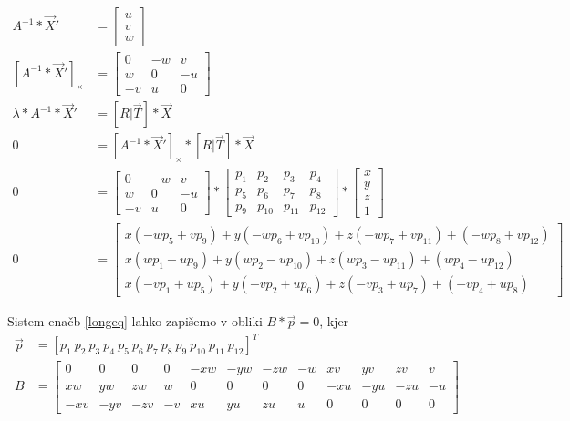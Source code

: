 \documentclass[a4paper, 12pt]{book}
\begin{document}
\begin{align}
\label{uvw}
A^{-1} * \vec{X}' &=
\begin{bmatrix}
u \\
v \\
w
\end{bmatrix} \\
[A^{-1} * \vec{X}']_{\times} &=
\begin{bmatrix}
0 & -w & v \\
w & 0 & -u \\
-v & u & 0
\end{bmatrix} \\[5ex]
\lambda * A^{-1} * \vec{X}' &= [R | \vec{T}] * \vec{X} \\
0 &= [A^{-1} * \vec{X}']_{\times} * [R | \vec{T}] * \vec{X}\\
0 &= 
\begin{bmatrix}
0 & -w & v \\
w & 0 & -u \\
-v & u & 0
\end{bmatrix}
*
\begin{bmatrix}
p_1 & p_2 & p_3 & p_4 \\
p_5 & p_6 & p_7 & p_8 \\
p_9 & p_{10} & p_{11} & p_{12}
\end{bmatrix}
*
\begin{bmatrix}
x \\
y \\
z \\
1
\end{bmatrix} \\
0 &= 
\begin{bmatrix}
x(-wp_5 + vp_9) + y(-wp_6 + vp_{10}) + z(-wp_7 + vp_{11}) + (-wp_8 + vp_{12}) \\
x(wp_1 - up_9) + y(wp_2 - up_{10}) + z(wp_3 - up_{11}) + (wp_4 - up_{12}) \\
x(-vp_1 + up_5) + y(-vp_2 + up_6) + z(-vp_3 + up_7) + (-vp_4 + up_8)
\end{bmatrix}
\label{longeq}
\end{align}

\setcounter{MaxMatrixCols}{20}
Sistem enačb \eqref{longeq} lahko zapišemo v obliki $B * \vec{p} = 0$, kjer
\begin{align}
\vec{p} &= [p_1 \ p_2 \ p_3 \ p_4 \ p_5 \ p_6 \ p_7 \ p_8 \ p_9 \ p_{10} \ p_{11} \ p_{12}]^T \\
B &=
\begin{bmatrix}
0 & 0 & 0 & 0 & -xw & -yw & -zw & -w & xv & yv & zv & v \\
xw & yw & zw & w & 0 & 0 & 0 & 0 & -xu & -yu & -zu & -u \\
-xv & -yv & -zv & -v & xu & yu & zu & u & 0 & 0 & 0 & 0
\end{bmatrix}
\label{bmatrix}
\end{align}
\end{document}
